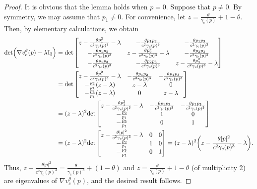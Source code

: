 \documentclass[reqno, 11pt, letterpaper]{amsart}
\theoremstyle{remark}
\numberwithin{equation}{section}
\numberwithin{theorem}{section}
\numberwithin{table}{section}
\numberwithin{figure}{section}
\begin{document}
\begin{proof}
It is obvious that the lemma holds when $p=0$. Suppose that $p\neq0$. By symmetry, we may assume that $p_1\neq 0$. For convenience, let $z=\frac{\theta}{\gamma_c(p)}+1-\theta$. Then, by elementary calculations, we obtain
$$\begin{aligned}
\textup{det}\Big(\nabla v_c^\theta(p)-\lambda\mathbb{I}_3\Big)&=\textup{det}\begin{bmatrix}z-\frac{\theta p_1^2}{c^2\gamma_c(p)^3}-\lambda& -\frac{\theta p_1 p_2}{c^2\gamma_c(p)^3}& -\frac{\theta p_1 p_3}{c^2\gamma_c(p)^3} \\ -\frac{\theta p_1 p_2}{c^2\gamma_c(p)^3}& z-\frac{\theta p_2^2}{c^2\gamma_c(p)^3}-\lambda& -\frac{\theta p_2 p_3}{c^2\gamma_c(p)^3} \\ -\frac{\theta p_1 p_3}{c^2\gamma_c(p)^3}& -\frac{\theta p_2 p_3}{c^2\gamma_c(p)^3}& z-\frac{\theta p_3^2}{c^2\gamma_c(p)^3}-\lambda \end{bmatrix}\\
&=\textup{det}\begin{bmatrix}z-\frac{\theta p_1^2}{c^2\gamma_c(p)^3}-\lambda& -\frac{\theta p_1 p_2}{c^2\gamma_c(p)^3}& -\frac{\theta p_1 p_3}{c^2\gamma_c(p)^3}  \\ -\frac{p_2}{p_1}(z-\lambda)& z-\lambda& 0 \\ -\frac{p_3}{p_1}(z-\lambda)& 0& z-\lambda \end{bmatrix}\\
&=(z-\lambda)^2\textup{det}\begin{bmatrix}z-\frac{\theta p_1^2}{c^2\gamma_c(p)^3}-\lambda& -\frac{\theta p_1 p_2}{c^2\gamma_c(p)^3}& -\frac{\theta p_1 p_3}{c^2\gamma_c(p)^3} \\ -\frac{p_2}{p_1}& 1& 0 \\ -\frac{p_3}{p_1}& 0& 1 \end{bmatrix}\\
&=(z-\lambda)^2\textup{det}\begin{bmatrix}z-\frac{\theta |p|^2}{c^2\gamma_c(p)^3}-\lambda& 0& 0 \\ -\frac{p_2}{p_1}& 1& 0 \\ -\frac{p_3}{p_1}& 0& 1 \end{bmatrix}=(z-\lambda)^2\bigg(z-\frac{\theta |p|^2}{c^2\gamma_c(p)^3}-\lambda\bigg).
\end{aligned}$$
Thus, $z-\frac{\theta |p|^2}{c^2\gamma_c(p)^3}=\frac{\theta}{\gamma_c(p)^3}+(1-\theta)$ and $z=\frac{\theta}{\gamma_c(p)}+1-\theta$ (of multiplicity 2) are eigenvalues of $\nabla v_c^\theta(p)$, and the desired result follows.
\end{proof}
\end{document}

